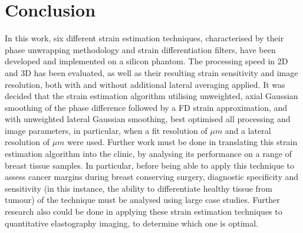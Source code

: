 
\section{Conclusion}

In this work, six different strain estimation techniques, characterised by their phase unwrapping methodology and strain differentiation filters, have been developed and implemented on a silicon phantom. The processing speed in 2D and 3D has been evaluated, as well as their resulting strain sensitivity and image resolution, both with and without additional lateral averaging applied. It was decided that the strain estimation algorithm utilising unweighted, axial Gaussian smoothing of the phase difference followed by a FD strain approximation, and with unweighted lateral Gaussian smoothing, best optimised all processing and image parameters, in particular, when a fit resolution of $\mu m$ and a lateral resolution of $\mu m$ were used.
Further work must be done in translating this strain estimation algorithm into the clinic, by analysing its performance on a range of breast tissue samples. In particular, before being able to apply this technique to assess cancer margins during breast conserving surgery, diagnostic specificity and sensitivity (in this instance, the ability to differentiate healthy tissue from tumour) of the technique must be analysed using large case studies. Further research also could be done in applying these strain estimation techniques to quantitative elastography imaging, to determine which one is optimal.


